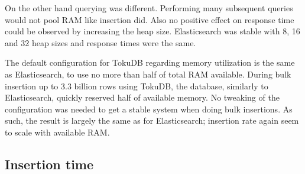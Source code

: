 On the other hand querying was different. Performing many subsequent queries would not pool RAM like insertion did. Also no positive effect on response time could be observed by increasing the heap size. Elasticsearch was stable with 8, 16 and 32 heap sizes and response times were the same. 

The default configuration for TokuDB regarding memory utilization is the same as Elasticsearch, to use no more than half of total RAM available. During bulk insertion up to 3.3 billion rows using TokuDB, the database, similarly to Elasticsearch, quickly reserved half of available memory. No tweaking of the configuration was needed to get a stable system when doing bulk insertions. As such, the result is largely the same as for Elasticsearch; insertion rate again seem to scale with available RAM.


%
%

\subsection{Insertion time}


